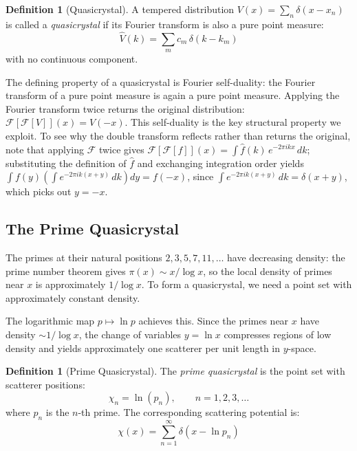 \documentclass[11pt, oneside]{article}
\theoremstyle{definition}
\newtheorem{definition}[theorem]{Definition}
\begin{document}
\begin{definition}[Quasicrystal]
A tempered distribution $V(x) = \sum_n \delta(x - x_n)$ is called
a \emph{quasicrystal} if its Fourier transform is also a pure point
measure:
\begin{equation}
\hat{V}(k) = \sum_{m} c_m\,\delta(k - k_m)
\end{equation}
with no continuous component.
\end{definition}

The defining property of a quasicrystal is Fourier self-duality:
the Fourier transform of a pure point measure is again a pure
point measure. Applying the Fourier transform twice returns the
original distribution: $\mathcal{F}[\mathcal{F}[V]](x) = V(-x)$.
This self-duality is the key structural property we exploit.
To see why the double transform reflects rather than returns the
original, note that applying $\mathcal{F}$ twice gives
$\mathcal{F}[\mathcal{F}[f]](x)
= \int \hat{f}(k)\,e^{-2\pi ikx}\,dk$;
substituting the definition of $\hat{f}$ and exchanging
integration order yields
$\int f(y)\left(\int e^{-2\pi ik(x+y)}\,dk\right)dy = f(-x)$,
since $\int e^{-2\pi ik(x+y)}\,dk = \delta(x+y)$,
which picks out $y = -x$.

\subsection{The Prime Quasicrystal}

The primes at their natural positions $2, 3, 5, 7, 11, \ldots$ have
decreasing density: the prime number theorem gives
$\pi(x) \sim x/\log x$, so the local density of primes near $x$ is
approximately $1/\log x$. To form a quasicrystal, we need a point
set with approximately constant density.

The logarithmic map $p \mapsto \ln p$ achieves this. Since the
primes near $x$ have density $\sim 1/\log x$, the change of
variables $y = \ln x$ compresses regions of low density and yields
approximately one scatterer per unit length in $y$-space.

\begin{definition}[Prime Quasicrystal]
\label{def:chi}
The \emph{prime quasicrystal} is the point set with scatterer
positions:
\begin{equation}
\chi_n = \ln(p_n), \qquad n = 1, 2, 3, \ldots
\end{equation}
where $p_n$ is the $n$-th prime. The corresponding scattering
potential is:
\begin{equation}
\chi(x) = \sum_{n=1}^{\infty} \delta\!\left(x - \ln p_n\right)
\end{equation}
\end{definition}
\end{document}
